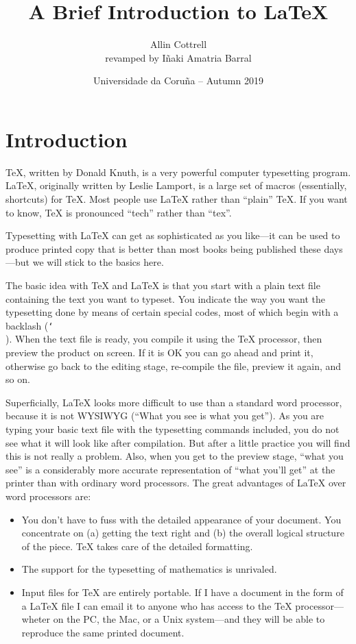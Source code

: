 \documentclass[12pt]{article}
\begin{document}
\title{A Brief Introduction to \LaTeX}
\author{Allin Cottrell\\\small revamped by Iñaki Amatria Barral}
\date{Universidade da Coruña -- Autumn 2019}
\maketitle

\section{Introduction}
\noindent
\TeX{}, written by Donald Knuth, is a very powerful computer typesetting
program. \LaTeX{}, originally written by Leslie Lamport, is a large set of
macros (essentially, shortcuts) for \TeX{}. Most people use \LaTeX{}
rather than ``plain'' \TeX{}. If you want to know, \TeX{} is pronounced
``tech'' rather than ``tex''.

Typesetting with \LaTeX{} can get as sophisticated as you like---it can be
used to produce printed copy that is better than most books being
published these days---but we will stick to the basics here.

The basic idea with \TeX{} and \LaTeX{} is that you start with a plain text
file containing the text you want to typeset. You indicate the way you want
the typesetting done by means of certain special codes, most of which begin
with a backlash ({\tt\char`\\}). When the text file is ready, you compile it
using the \TeX{} processor, then preview the product on screen. If it is OK
you can go ahead and print it, otherwise go back to the editing stage,
re-compile the file, preview it again, and so on.

Superficially, \LaTeX{} looks more difficult to use than a standard word
processor, because it is not WYSIWYG (``What you see is what you get'').
As you are typing your basic text file with the typesetting commands
included, you do not see what it will look like after compilation. But
after a little practice you will find this is not really a problem. Also,
when you get to the preview stage, ``what you see'' is a considerably more
accurate representation of ``what you'll get'' at the printer than with
ordinary word processors. The great advantages of \LaTeX{} over word
processors are:

\begin{itemize}
\item You don't have to fuss with the detailed appearance of your
document. You concentrate on (a) getting the text right and (b) the
overall logical structure of the piece. \TeX{} takes care of the detailed
formatting.
\item The support for the typesetting of mathematics is unrivaled.
\item Input files for \TeX{} are entirely portable. If I have a document
in the form of a \LaTeX{} file I can email it to anyone who has access to
the \TeX{} processor---wheter on the PC, the Mac, or a Unix system---and
they will be able to reproduce the same printed document.
\end{itemize}
\end{document}
